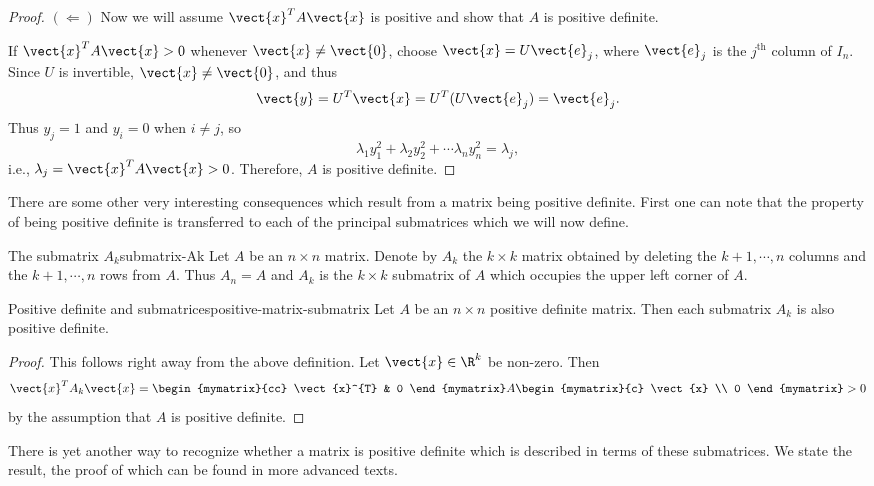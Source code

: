 \begin{proof}
$(\Leftarrow)$ Now we will assume $\vect{x}^T A \vect{x} $ is positive and show that $A$ is positive definite.

If $\vect{x}^TA\vect{x}>0$ whenever $\vect{x}\neq \vect{0}$,
choose $\vect{x}=U\vect{e}_j$, where $\vect{e}_j$ is the $j^{\mbox{th}}$
column of $I_n$.
Since $U$ is invertible, $\vect{x}\neq\vect{0}$, 
and thus
\[ \vect{y}=U^T\vect{x}=U^T(U\vect{e}_j) =\vect{e}_j.\]
Thus $y_j=1$ and $y_i=0$ when $i\neq j$, so
\[ \lambda_1 y_1^2 + \lambda_2 y_2^2 + \cdots \lambda_n y_n^2
=\lambda_j,\]
i.e., $\lambda_j=\vect{x}^TA\vect{x}>0$.
Therefore, $A$ is positive definite.
\end{proof}

There are some other very interesting consequences which result from a
matrix being positive definite. First one can note that the property of
being positive definite is transferred to each of the principal submatrices which we will now define.

\begin{definition}{The submatrix $A_k$}{submatrix-Ak}
Let $A$ be an $n\times n$ matrix. Denote by $A_{k}$ the $k\times k$ matrix
obtained by deleting the $k+1,\cdots ,n$ columns and the $k+1,\cdots ,n$
rows from $A.$ Thus $A_{n}=A$ and $A_{k}$ is the $k\times k$ submatrix of $A$
which occupies the upper left corner of $A.$
\end{definition}

\begin{lemma}{Positive definite and submatrices}{positive-matrix-submatrix}
Let $A$ be an $n\times n$ positive definite matrix.  Then each submatrix $A_{k}$ is also positive definite.
\end{lemma}

\begin{proof}
This follows right away from the above definition. Let $\vect{x}\in \R^{k}$ be non-zero. Then 
\begin{equation*}
\vect{x}^{T}A_{k}\vect{x}=\begin{mymatrix}{cc}
\vect{x}^{T} & 0
\end{mymatrix} A\begin{mymatrix}{c}
\vect{x} \\ 
0
\end{mymatrix} >  0
\end{equation*}
by the assumption that $A$ is positive definite.
\end{proof}

There is yet another way to recognize whether a matrix is positive definite
which is described in terms of these submatrices. We state the result,  the proof
of which can be found in more advanced texts.

